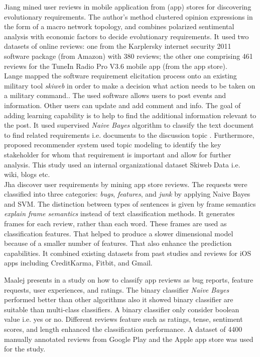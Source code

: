 Jiang \etal \cite{Jiang:2014} mined user reviews in mobile application from 
(app) stores for discovering evolutionary requirements. The author's method
clustered opinion expressions in the form of a macro network
topology, and combines polarized
sentimental analysis with economic factors to decide evolutionary
requirements. It used two datasets of online reviews: one from the
Karplersky internet security 2011 software package (from Amazon) with 380
reviews; the other one  comprising 461 reviews for the  TuneIn Radio Pro V3.6
mobile app (from the app store).\\

Lange \etal\cite{Douglas:S2008} mapped the software requirement elicitation
process onto an existing military tool \emph{skiweb} in order to make a decision what action needs to be taken on a military command.. The used software allows users to post events and information. Other users can update and add comment and info. The goal of adding learning capability is to help to find the additional information relevant to the post.  It used supervised
\emph{Naive Bayes} algorithm to classify the text document to find related
requirements i.e. documents to the discussion topic . Furthermore, proposed recommender
system used topic modeling to identify the key
stakeholder for whom that requirement is important and allow for further
analysis. This study used an internal organizational
dataset Skiweb Data i.e. wiki, blogs etc.\\

Jha \etal \cite{Jha:2017} discover user requirements by mining app store reviews. The requests were classified into three categories:
\emph{bugs}, \emph{features}, and \emph{junk} by applying Naive Bayes and SVM. The distinction between types of sentences is given by frame semantics \emph{explain frame semantics} instead of text classification methods. It generates frames for each review, rather than each word. These frames are used as classification features. That helped to
produce a slower dimensional model because of a smaller number of
features. That also enhance the prediction capabilities. It combined existing
datasets from past studies and reviews for iOS apps including CreditKarma,
Fitbit, and Gmail.

Maalej presents in \cite{Maalej} a study on how to classify app reviews as bug
reports, feature requests, user experiences, and ratings. The binary classifier
\emph{Naive Bayes} performed better than other algorithms also it showed binary
classifier are suitable than multi-class
classifiers. A binary classifier only consider boolean value i.e. yes or no. Different reviews feature such as ratings,
tense, sentiment scores, and length enhanced the classification performance. A
dataset of 4400 manually annotated reviews from Google Play and the Apple app
store was used for the study.\\

